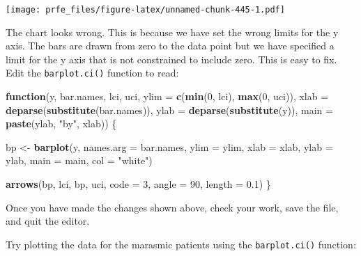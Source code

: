 \documentclass[12pt,a4paper]{book}
\newenvironment{Shaded}{\begin{snugshade}}{\end{snugshade}}
\newcommand{\ControlFlowTok}[1]{\textcolor[rgb]{0.13,0.29,0.53}{\textbf{#1}}}
\newcommand{\DataTypeTok}[1]{\textcolor[rgb]{0.13,0.29,0.53}{#1}}
\newcommand{\DecValTok}[1]{\textcolor[rgb]{0.00,0.00,0.81}{#1}}
\newcommand{\FloatTok}[1]{\textcolor[rgb]{0.00,0.00,0.81}{#1}}
\newcommand{\KeywordTok}[1]{\textcolor[rgb]{0.13,0.29,0.53}{\textbf{#1}}}
\newcommand{\NormalTok}[1]{#1}
\newcommand{\OperatorTok}[1]{\textcolor[rgb]{0.81,0.36,0.00}{\textbf{#1}}}
\newcommand{\StringTok}[1]{\textcolor[rgb]{0.31,0.60,0.02}{#1}}
\theoremstyle{definition}
\theoremstyle{definition}
\theoremstyle{definition}
\theoremstyle{remark}
\begin{document}
\texttt{[image: prfe\_files/figure-latex/unnamed-chunk-445-1.pdf]}

The chart looks wrong. This is because we have set the wrong limits for
the y axis. The bars are drawn from zero to the data point but we have
specified a limit for the y axis that is not constrained to include
zero. This is easy to fix. Edit the \texttt{barplot.ci()} function to
read:

\begin{Shaded}
\begin{Highlighting}[]
\ControlFlowTok{function}\NormalTok{(y, bar.names, lci, uci,}
         \DataTypeTok{ylim =} \KeywordTok{c}\NormalTok{(}\KeywordTok{min}\NormalTok{(}\DecValTok{0}\NormalTok{, lci), }\KeywordTok{max}\NormalTok{(}\DecValTok{0}\NormalTok{, uci)),}
         \DataTypeTok{xlab =} \KeywordTok{deparse}\NormalTok{(}\KeywordTok{substitute}\NormalTok{(bar.names)),}
         \DataTypeTok{ylab =} \KeywordTok{deparse}\NormalTok{(}\KeywordTok{substitute}\NormalTok{(y)),}
         \DataTypeTok{main =} \KeywordTok{paste}\NormalTok{(ylab, }\StringTok{"by"}\NormalTok{, xlab)) \{}

\NormalTok{  bp <-}\StringTok{ }\KeywordTok{barplot}\NormalTok{(y, }\DataTypeTok{names.arg =}\NormalTok{ bar.names,  }\DataTypeTok{ylim =}\NormalTok{ ylim, }\DataTypeTok{xlab =}\NormalTok{ xlab,}
                \DataTypeTok{ylab =}\NormalTok{ ylab, }\DataTypeTok{main =}\NormalTok{ main, }\DataTypeTok{col =} \StringTok{"white"}\NormalTok{)}
     
  \KeywordTok{arrows}\NormalTok{(bp, lci, bp, uci, }\DataTypeTok{code =} \DecValTok{3}\NormalTok{, }\DataTypeTok{angle =} \DecValTok{90}\NormalTok{, }\DataTypeTok{length =} \FloatTok{0.1}\NormalTok{)}
\NormalTok{\}}
\end{Highlighting}
\end{Shaded}

Once you have made the changes shown above, check your work, save the
file, and quit the editor.

Try plotting the data for the marasmic patients using the
\texttt{barplot.ci()} function:

\begin{Shaded}
\end{Shaded}
\end{document}

